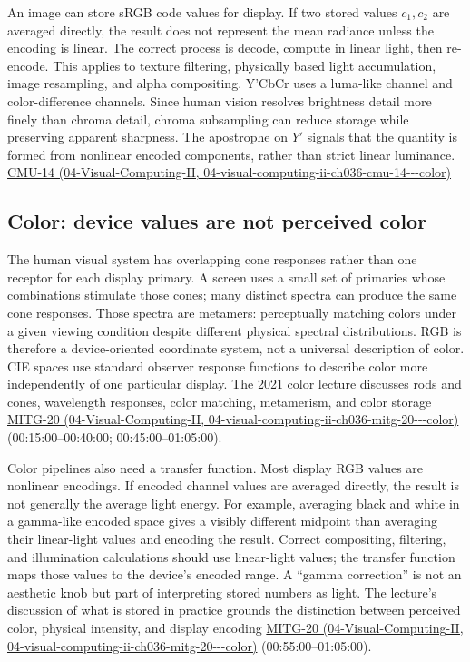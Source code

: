 An image can store sRGB code values for display. If two stored values \(c_1,c_2\) are averaged directly, the result does not represent the mean radiance unless the encoding is linear. The correct process is decode, compute in linear light, then re-encode. This applies to texture filtering, physically based light accumulation, image resampling, and alpha compositing. Y'CbCr uses a luma-like channel and color-difference channels. Since human vision resolves brightness detail more finely than chroma detail, chroma subsampling can reduce storage while preserving apparent sharpness. The apostrophe on \(Y'\) signals that the quantity is formed from nonlinear encoded components, rather than strict linear luminance. \href{../04-Visual-Computing-II/main.pdf\#nameddest=04-visual-computing-ii-ch036-cmu-14---color}{CMU-14 (04-Visual-Computing-II, 04-visual-computing-ii-ch036-cmu-14-\/-\/-color)}

\subsection{Color: device values are not perceived color}\label{03-visual-computing-i-ch004-color-device-values-are-not-perceived-color}

The human visual system has overlapping cone responses rather than one receptor for each display primary. A screen uses a small set of primaries whose combinations stimulate those cones; many distinct spectra can produce the same cone responses. Those spectra are metamers: perceptually matching colors under a given viewing condition despite different physical spectral distributions. RGB is therefore a device-oriented coordinate system, not a universal description of color. CIE spaces use standard observer response functions to describe color more independently of one particular display. The 2021 color lecture discusses rods and cones, wavelength responses, color matching, metamerism, and color storage \href{../04-Visual-Computing-II/main.pdf\#nameddest=04-visual-computing-ii-ch036-mitg-20---color}{MITG-20 (04-Visual-Computing-II, 04-visual-computing-ii-ch036-mitg-20-\/-\/-color)} (00:15:00--00:40:00; 00:45:00--01:05:00).

Color pipelines also need a transfer function. Most display RGB values are nonlinear encodings. If encoded channel values are averaged directly, the result is not generally the average light energy. For example, averaging black and white in a gamma-like encoded space gives a visibly different midpoint than averaging their linear-light values and encoding the result. Correct compositing, filtering, and illumination calculations should use linear-light values; the transfer function maps those values to the device's encoded range. A ``gamma correction'' is not an aesthetic knob but part of interpreting stored numbers as light. The lecture's discussion of what is stored in practice grounds the distinction between perceived color, physical intensity, and display encoding \href{../04-Visual-Computing-II/main.pdf\#nameddest=04-visual-computing-ii-ch036-mitg-20---color}{MITG-20 (04-Visual-Computing-II, 04-visual-computing-ii-ch036-mitg-20-\/-\/-color)} (00:55:00--01:05:00).

